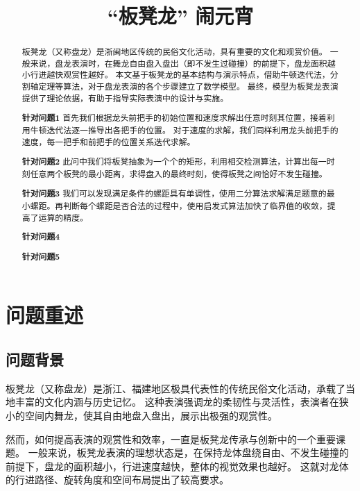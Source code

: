 \documentclass[withoutpreface,bwprint]{cumcmthesis} %
\title{“板凳龙” 闹元宵}
\newcommand{\tbf}[1]{\textbf{#1}}
\begin{document}
\maketitle
 \begin{abstract}
    板凳龙（又称盘龙）是浙闽地区传统的民俗文化活动，具有重要的文化和观赏价值。
    一般来说，盘龙表演时，在舞龙自由盘入盘出（即不发生过碰撞）的前提下，盘龙面积越小行进越快观赏性越好。
    本文基于板凳龙的基本结构与演示特点，借助牛顿迭代法，分割轴定理等算法，对于盘龙表演的各个步骤建立了数学模型。
    最终，模型为板凳龙表演提供了理论依据，有助于指导实际表演中的设计与实施。

    \tbf{针对问题1}
    首先我们根据龙头前把手的初始位置和速度求解出任意时刻其位置，接着利用牛顿迭代法逐一推导出各把手的位置。
    对于速度的求解，我们同样利用龙头前把手的速度，每一把手和前把手的位置关系迭代求解。

    \tbf{针对问题2}
    此问中我们将板凳抽象为一个个的矩形，利用相交检测算法，计算出每一时刻任意两个板凳的最小距离，求得盘入的最终时刻，使得板凳之间恰好不发生碰撞。

    \tbf{针对问题3}
    我们可以发现满足条件的螺距具有单调性，使用二分算法求解满足题意的最小螺距。再判断每个螺距是否合法的过程中，使用启发式算法加快了临界值的收敛，提高了运算的精度。

    \tbf{针对问题4}

    \tbf{针对问题5}
\end{abstract}

\tableofcontents

\newpage

\section{问题重述}

\subsection{问题背景}
板凳龙（又称盘龙）是浙江、福建地区极具代表性的传统民俗文化活动，承载了当地丰富的文化内涵与历史记忆。
这种表演强调龙的柔韧性与灵活性，表演者在狭小的空间内舞龙，使其自由地盘入盘出，展示出极强的观赏性。

然而，如何提高表演的观赏性和效率，一直是板凳龙传承与创新中的一个重要课题。
一般来说，板凳龙表演的理想状态是，在保持龙体盘绕自由、不发生碰撞的前提下，盘龙的面积越小，行进速度越快，整体的视觉效果也越好。
这就对龙体的行进路径、旋转角度和空间布局提出了较高要求。
\end{document}
